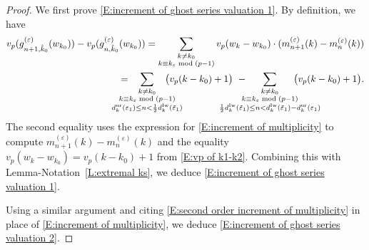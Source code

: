 \documentclass[12pt]{amsart}
\theoremstyle{definition}
\numberwithin{equation}{subsection}
\def\k{\mathbf{k}}
\newcommand{\Iw}{\mathrm{Iw}}
\newcommand{\unr}{\mathrm{ur}}
\begin{document}
\begin{proof}
We first prove \eqref{E:increment of ghost series valuation 1}.
By definition, we have
\begin{align*}
v_p(g_{n+1, \hat k_0}^{(\varepsilon)}(w_{k_0})) - v_p(g_{n, \hat k_0}^{(\varepsilon)}(w_{k_0})) = 
\sum_{\substack{k \neq k_0\\k \equiv k_\varepsilon \bmod{(p-1)}}} v_p(w_k-w_{k_0}) \cdot (m_{n+1}^{(\varepsilon)}(k) - m_{n}^{(\varepsilon)}(k))
\\=  \hspace{-20pt}
\sum_{\substack{
k \neq k_0
\\k \equiv k_\varepsilon \bmod{(p-1)}
\\
d_{k}^\unr(\varepsilon_1) \leq n < \frac 12 d_{k}^\Iw(\tilde \varepsilon_1)}}
\hspace{-20pt}\big( v_p(k-k_0)+1 \big)\ -  \hspace{-30pt} \sum_{\substack{
k \neq k_0
\\k \equiv k_\varepsilon \bmod{(p-1)}
\\
\frac 12 d_{k}^\Iw(\tilde \varepsilon_1)  \leq n < d_{k}^{\Iw}(\tilde \varepsilon_1) - d_{k}^\unr(\varepsilon_1)  }}
\hspace{-30pt}\big( v_p(k-k_0)+1 \big).
\end{align*}
The second equality uses the expression for \eqref{E:increment of multiplicity} to compute $m_{n+1}^{(\varepsilon)}(k) - m_{n}^{(\varepsilon)}(k)$ and the equality $v_p(w_k-w_{k_0}) =v_p(k-k_0)+1$ from \eqref{E:vp of k1-k2}.
Combining this with Lemma-Notation~\ref{L:extremal ks}, we deduce \eqref{E:increment of ghost series valuation 1}.

Using a similar argument and citing \eqref{E:second order increment of multiplicity} in place of \eqref{E:increment of multiplicity}, we deduce \eqref{E:increment of ghost series valuation 2}.
\end{proof}
\end{document}
